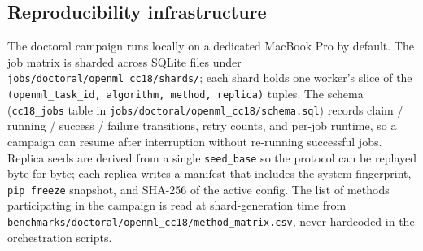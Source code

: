 \subsection{Reproducibility infrastructure}
\label{sec:method-infra}
The doctoral campaign runs locally on a dedicated MacBook Pro by
default. The job matrix is sharded across SQLite files under
\texttt{jobs/doctoral/openml\_cc18/shards/}; each shard holds one
worker's slice of the
\texttt{(\texttt{openml\_task\_id},\,\texttt{algorithm},\,\texttt{method},\,\texttt{replica})}
tuples. The schema (\texttt{cc18\_jobs} table in
\texttt{jobs/doctoral/openml\_cc18/schema.sql}) records claim /
running / success / failure transitions, retry counts, and per-job
runtime, so a campaign can resume after interruption without
re-running successful jobs. Replica seeds are derived from a single
\texttt{seed\_base} so the protocol can be replayed byte-for-byte;
each replica writes a manifest that includes the system fingerprint,
\texttt{pip freeze} snapshot, and SHA-256 of the active config. The
list of methods participating in the campaign is read at
shard-generation time from
\texttt{benchmarks/doctoral/openml\_cc18/method\_matrix.csv}, never
hardcoded in the orchestration scripts.
